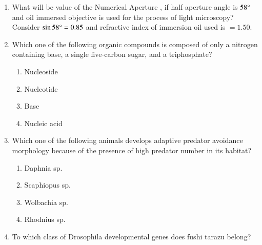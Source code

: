 \documentclass[journal,12pt,onecolumn]{IEEEtran}
\theoremstyle{remark}
\begin{document}
\begin{enumerate}
    \hfill{}

    \item What will be value of the Numerical Aperture , if half aperture angle is $58\degree$ and oil immersed objective is used for the process of light microscopy?  Consider $\sin 58\degree = 0.85$ and refractive index of immersion oil used is $= 1.50$.

    \hfill{}

    \item Which one of the following organic compounds is composed of only  a nitrogen containing base,  a single five-carbon sugar, and  a triphosphate?

    \hfill{}
    \begin{enumerate}
        \item Nucleoside
        \item Nucleotide
        \item Base
        \item Nucleic acid
    \end{enumerate}

    \item Which one of the following animals develops adaptive predator avoidance morphology because of the presence of high predator number in its habitat?

    \hfill{}
    \begin{enumerate}
        \item Daphnia sp.
        \item Scaphiopus sp.
        \item Wolbachia sp.
        \item Rhodnius sp.
    \end{enumerate}

    \item To which class of Drosophila developmental genes does fushi tarazu  belong?

    \hfill{}
    \begin{enumerate}
    \end{enumerate}


\end{enumerate}
\end{document}
